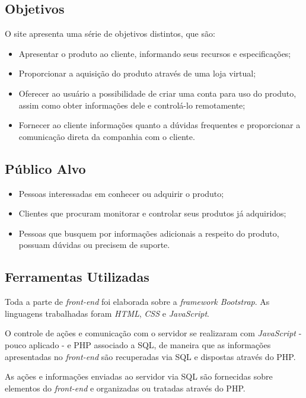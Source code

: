 \documentclass[a4paper, 12pt]{article}
\begin{document}
\subsection{Objetivos}

O site apresenta uma série de objetivos distintos, que são:

\begin{itemize}
\item Apresentar o produto ao cliente, informando seus recursos e especificações;
\item Proporcionar a aquisição do produto através de uma loja virtual;
\item Oferecer ao usuário a possibilidade de criar uma conta para uso do produto, assim como obter informações dele e controlá-lo remotamente;
\item Fornecer ao cliente informações quanto a dúvidas frequentes e proporcionar a comunicação direta da companhia com o cliente.
\end{itemize}

\subsection{Público Alvo}

\begin{itemize}
\item Pessoas interessadas em conhecer ou adquirir o produto;
\item Clientes que procuram monitorar e controlar seus produtos já adquiridos;
\item Pessoas que busquem por informações adicionais a respeito do produto, possuam dúvidas ou precisem de suporte.
\end{itemize}

\subsection{Ferramentas Utilizadas}

Toda a parte de \textit{front-end} foi elaborada sobre a \textit{framework Bootstrap}. As linguagens trabalhadas foram \textit{HTML}, \textit{CSS} e \textit{JavaScript}.

O controle de ações e comunicação com o servidor se realizaram com \textit{JavaScript} - pouco aplicado - e PHP associado a SQL, de maneira que as informações apresentadas no \textit{front-end} são recuperadas via SQL e dispostas através do PHP.

As ações e informações enviadas ao servidor via SQL são fornecidas sobre elementos do \textit{front-end} e organizadas ou tratadas através do PHP.
\end{document}
